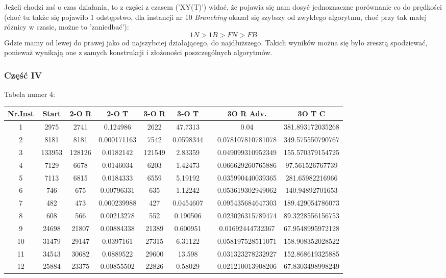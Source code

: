 \documentclass{article}
\begin{document}
Jeżeli chodzi zaś o czas działania, to z części z czasem ('XY(T)') widać, że pojawia się nam dosyć jednoznaczne porównanie co do prędkości (choć tu także się pojawiło 1 odstępstwo, dla instancji nr 10 \textit{Branching} okazał się szybszy od zwykłego algorytmu, choć przy tak małej różnicy w czasie, możne to 'zaniedbać'):
\[1N > 1B > FN > FB\]
Gdzie mamy od lewej do prawej jako od najszybciej działającego, do najdłuższego. Takich wyników można się było zresztą spodziewać, ponieważ wynikają one z samych konstrukcji i złożoności poszczególnych algorytmów.

\newpage
\subsubsection{Część IV}
Tabela numer 4:
\begin{table}[h!]
\centering
\begin{tabular}{c||c|c|c|c|c c c|c}
Nr.Inst & Start & 2-O R & 2-O T & 3-O R & 3-O T &  & 3O R Adv. & 3O T C \\
\hline
1 & 2975 & 2741 & 0.124986 & 2622 & 47.7313 &  & 0.04 & 381.893172035268 \\
2 & 8181 & 8181 & 0.000171163 & 7542 & 0.0598344 &  & 0.078107810781078 & 349.575550790767 \\
3 & 133953 & 128126 & 0.0182142 & 121549 & 2.83359 &  & 0.049099310952349 & 155.570379154725 \\
4 & 7129 & 6678 & 0.0146034 & 6203 & 1.42473 &  & 0.066629260765886 & 97.561526767739 \\
5 & 7113 & 6815 & 0.0184333 & 6559 & 5.19192 &  & 0.035990440039365 & 281.65982216966 \\
6 & 746 & 675 & 0.00796331 & 635 & 1.12242 &  & 0.053619302949062 & 140.94892701653 \\
7 & 482 & 473 & 0.000239988 & 427 & 0.0454607 &  & 0.095435684647303 & 189.429054786073 \\
8 & 608 & 566 & 0.00213278 & 552 & 0.190506 &  & 0.023026315789474 & 89.3228556156753 \\
9 & 24698 & 21807 & 0.00884338 & 21389 & 0.600951 &  & 0.01692444732367 & 67.9548995972128 \\
10 & 31479 & 29147 & 0.0397161 & 27315 & 6.31122 &  & 0.058197528511071 & 158.908352028522 \\
11 & 34543 & 30682 & 0.0889522 & 29600 & 13.598 &  & 0.031323278232927 & 152.868619325885 \\
12 & 25884 & 23375 & 0.00855502 & 22826 & 0.58029 &  & 0.021210013908206 & 67.8303498998249 \\

\end{tabular}
\end{table}
\end{document}
